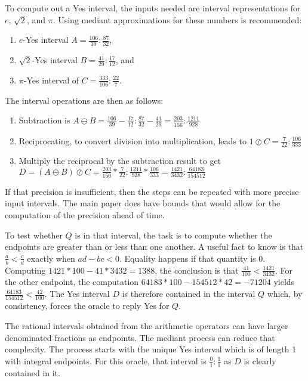 \documentclass[12pt]{article}
\theoremstyle{remark}
\begin{document}
To compute out a Yes interval, the inputs needed are interval representations for $e$, $\sqrt{2}$, and $\pi$. Using mediant approximations for these numbers is recommended: 
\begin{enumerate}
\item $e$-Yes interval $A  = \frac{106}{39}: \frac{87}{32}$,
\item $\sqrt{2}$-Yes interval $B = \frac{41}{29}: \frac{17}{12}$, and
\item $\pi$-Yes interval of $C= \frac{333}{106}: \frac{22}{7}$.
\end{enumerate}
The interval operations are then as follows:
\begin{enumerate}
\item Subtraction is $A\ominus B = \frac{106}{39} - \frac{17}{12}: \frac{87}{32} - \frac{41}{29} = \frac{203}{156}: \frac{1211}{928}$ 
\item Reciprocating, to convert division into multiplication, leads to  $1\oslash C = \frac{7}{22}: \frac{106}{333}$
\item Multiply the reciprocal by the subtraction result to get $D = (A\ominus B)\oslash C = \frac{203}{156} *\frac{7}{22}: \frac{1211}{928} * \frac{106}{333} = \frac{1421}{3432}: \frac{64183}{154512}$
\end{enumerate}
If that precision is insufficient, then the steps can be repeated with more precise input intervals. The main paper does have bounds that would allow for the computation of the precision ahead of time. 

To test whether $Q$ is in that interval, the task is to compute whether the endpoints are greater than or less than one another. A useful fact to know is that $\frac{a}{b} < \frac{c}{d}$ exactly when $ad - bc < 0$. Equality happens if that quantity is 0. Computing $1421*100 - 41*3432 = 1388$, the conclusion is that $\frac{41}{100} < \frac{1421}{3432}$. For the other endpoint, the computation $64183*100 - 154512*42 = -71204$ yields $ \frac{64183}{154512} < \frac{42}{100}$. The Yes interval $D$ is therefore contained in the interval $Q$ which, by consistency, forces the oracle to reply Yes for $Q$. 

The rational intervals obtained from the arithmetic operators can have larger denominated fractions as endpoints. The mediant process can reduce that complexity. The process starts with the unique Yes interval which is of length 1 with integral endpoints. For this oracle, that interval is $\frac{0}{1}:\frac{1}{1}$ as $D$ is clearly contained in it. 
\end{document}
